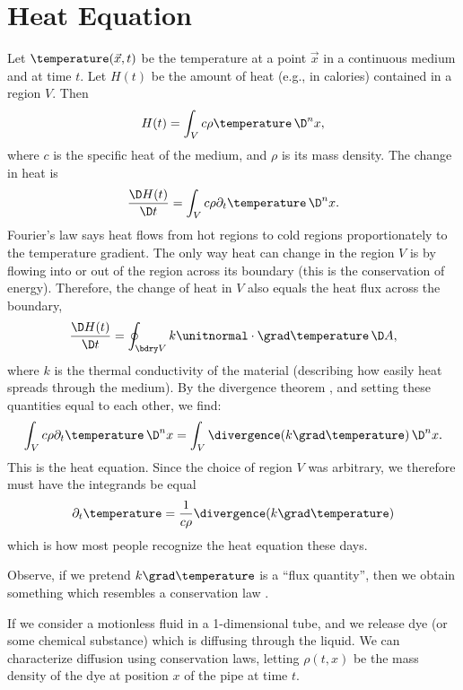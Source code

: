 \section{Heat Equation}

\begin{node}[Derivation]\label{pde:heat-0000}%
Let $\temperature(\vec{x},t)$ be the temperature at a point $\vec{x}$ in
a continuous medium and at time $t$. Let $H(t)$ be the amount of heat
(e.g., in calories) contained in a region $V$. Then
\begin{equation*}
H(t)=\int_{V}c\rho\temperature\,\D^{n}x,
\end{equation*}
where $c$ is the specific heat of the medium, and $\rho$ is its mass
density. The change in heat is
\begin{equation*}
\frac{\D H(t)}{\D t}=\int_{V}c\rho\partial_{t}\temperature\,\D^{n}x.
\end{equation*}
Fourier's law says heat flows from hot regions to cold regions
proportionately to the temperature gradient. The only way heat can
change in the region $V$ is by flowing into or out of the region across
its boundary (this is the conservation of energy). Therefore, the change
of heat in $V$ also equals the heat flux across the boundary,
\begin{equation*}
\frac{\D H(t)}{\D t}=\oint_{\bdry V}k\unitnormal\cdot\grad\temperature\,\D A,
\end{equation*}
where $k$ is the thermal conductivity of the material (describing how
easily heat spreads through the medium). By the divergence theorem ,
and setting these quantities equal to each other, we find:
\begin{equation}
\int_{V}c\rho\partial_{t}\temperature\,\D^{n}x=\int_{V}\divergence(k\grad\temperature)\,\D^{n}x.
\end{equation}
This is the heat equation. Since the choice of region $V$ was arbitrary,
we therefore must have the integrands be equal
\begin{equation}\label{eq:pde:heat:heat-equation}
\partial_{t}\temperature=\frac{1}{c\rho}\divergence(k\grad\temperature)
\end{equation}
which is how most people recognize the heat equation these days.

Observe, if we pretend $k\grad\temperature$ is a ``flux quantity'', then
we obtain something which resembles a conservation law .

\begin{node}[Diffusion]\label{pde:heat-0002}%
If we consider a motionless fluid in a 1-dimensional tube, and we
release dye (or some chemical substance) which is diffusing through the
liquid. We can characterize diffusion using conservation laws, letting
$\rho(t,x)$ be the mass density of the dye at position $x$ of the pipe
at time $t$.


\end{node}
\end{node}
